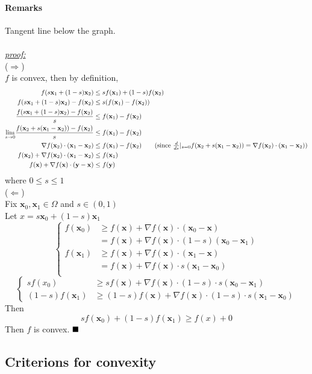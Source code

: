 \documentclass[11pt]{article}
\newcommand{\tb}[1]{\textbf{#1}}
\newcommand{\proof}[0]{\textit{\underline{proof:} }}
\newcommand{\vx}[0]{\tb{x}}
\newcommand{\vy}[0]{\tb{y}}
\newcommand{\qed}[0]{$\hfill\blacksquare$}
\begin{document}
\paragraph{Remarks}
Tangent line below the graph.\\\\
\proof \\
($\Rightarrow$) \\
$f$ is convex, then by definition,
\begin{align*}
f(s\vx_1 + (1-s)\vx_2) &\leq sf(\vx_1) + (1-s)f(\vx_2)\\
f(s\vx_1 + (1-s)\vx_2) - f(\vx_2) &\leq s(f(\vx_1) - f(\vx_2)) \\
\frac{f(s\vx_1 + (1-s)\vx_2) - f(\vx_2)}{s} &\leq f(\vx_1) - f(\vx_2) \\
\underset{s \rightarrow 0}{\lim} \frac{f(\vx_2 + s(\vx_1 - \vx_2)) - f(\vx_2)}{s} &\leq f(\vx_1) - f(\vx_2) \\
\nabla f(\vx_2)\cdot(\vx_1 - \vx_2) &\leq f(\vx_1) - f(\vx_2) \tag{since $\frac{d}{ds}|_{s=0} f(\vx_2 + s(\vx_1 - \vx_2)) = \nabla f(\vx_2) \cdot (\vx_1 - \vx_2)$}\\
f(\vx_2) + \nabla f(\vx_2)\cdot(\vx_1 - \vx_2) &\leq f(\vx_1)\\
f(\vx) + \nabla f(\vx) \cdot (\vy-\vx) &\leq f(\vy)
\end{align*}
where $0\leq s \leq 1$ \\
($\Leftarrow$)\\
Fix $\vx_0, \vx_1 \in \Omega$ and $s \in (0,1)$ \\
Let $x = s\vx_0 + (1-s)\vx_1$ \\
$$\begin{cases}
	f(\vx_0) &\geq f(\vx) + \nabla f(\vx) \cdot (\vx_0 - \vx) \\
	&= f(\vx) + \nabla f(\vx) \cdot (1-s)(\vx_0 - \vx_1) \\
	f(\vx_1) &\geq f(\vx) + \nabla f(\vx) \cdot (\vx_1 - \vx) \\
	&= f(\vx) + \nabla f(\vx) \cdot s(\vx_1 - \vx_0) \\
\end{cases}$$
	$$\begin{cases}sf(x_0) &\geq sf(\vx) + \nabla f(\vx) \cdot (1-s) \cdot s(\vx_0 - \vx_1) \\
	(1-s)f(\vx_1) &\geq (1-s)f(\vx) + \nabla f(\vx) \cdot (1-s)\cdot s(\vx_1 - \vx_0)  \end{cases}$$
Then
$$sf(\vx_0) + (1-s)f(\vx_1) \geq f(x) + 0$$
Then $f$ is convex.
\qed

\subsection{Criterions for convexity}
\end{document}

